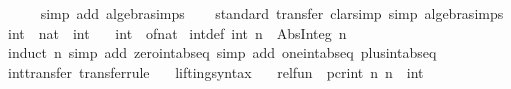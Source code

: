 \begin{isabellebody}
\ \ \ \ \isamarkupfalse%
\ {\isacharparenleft}{\kern0pt}simp\ add{\isacharcolon}{\kern0pt}\ algebra{\isacharunderscore}{\kern0pt}simps{\isacharparenright}{\kern0pt}\isanewline
{}\isamarkupfalse%
%
\endisatagproof
{\isafoldproof}%
%
\isadelimproof
\isanewline
%
\endisadelimproof
\isanewline
{}\isamarkupfalse%
\isanewline
%
\isadelimproof
\ \ %
\endisadelimproof
%
\isatagproof
{}\isamarkupfalse%
\ standard\ {\isacharparenleft}{\kern0pt}transfer{\isacharsemicolon}{\kern0pt}\ clarsimp\ simp{\isacharcolon}{\kern0pt}\ algebra{\isacharunderscore}{\kern0pt}simps{\isacharparenright}{\kern0pt}{\isacharplus}{\kern0pt}%
\endisatagproof
{\isafoldproof}%
%
\isadelimproof
\isanewline
%
\endisadelimproof
\isanewline
{}\isamarkupfalse%
\isanewline
\isanewline
{}\isamarkupfalse%
\ int\ {\isacharcolon}{\kern0pt}{\isacharcolon}{\kern0pt}\ {\isachardoublequoteopen}nat\ {\isasymRightarrow}\ int{\isachardoublequoteclose}\isanewline
\ \ \ {\isachardoublequoteopen}int\ {\isasymequiv}\ of{\isacharunderscore}{\kern0pt}nat{\isachardoublequoteclose}\isanewline
\isanewline
{}\isamarkupfalse%
\ int{\isacharunderscore}{\kern0pt}def{\isacharcolon}{\kern0pt}\ {\isachardoublequoteopen}int\ n\ {\isacharequal}{\kern0pt}\ Abs{\isacharunderscore}{\kern0pt}Integ\ {\isacharparenleft}{\kern0pt}n{\isacharcomma}{\kern0pt}\ {}{\isacharparenright}{\kern0pt}{\isachardoublequoteclose}\isanewline
%
\isadelimproof
\ \ %
\endisadelimproof
%
\isatagproof
{}\isamarkupfalse%
\ {\isacharparenleft}{\kern0pt}induct\ n{\isacharparenright}{\kern0pt}\ {\isacharparenleft}{\kern0pt}simp\ add{\isacharcolon}{\kern0pt}\ zero{\isacharunderscore}{\kern0pt}int{\isachardot}{\kern0pt}abs{\isacharunderscore}{\kern0pt}eq{\isacharcomma}{\kern0pt}\ simp\ add{\isacharcolon}{\kern0pt}\ one{\isacharunderscore}{\kern0pt}int{\isachardot}{\kern0pt}abs{\isacharunderscore}{\kern0pt}eq\ plus{\isacharunderscore}{\kern0pt}int{\isachardot}{\kern0pt}abs{\isacharunderscore}{\kern0pt}eq{\isacharparenright}{\kern0pt}%
\endisatagproof
{\isafoldproof}%
%
\isadelimproof
\isanewline
%
\endisadelimproof
\isanewline
{}\isamarkupfalse%
\ int{\isacharunderscore}{\kern0pt}transfer\ {\isacharbrackleft}{\kern0pt}transfer{\isacharunderscore}{\kern0pt}rule{\isacharbrackright}{\kern0pt}{\isacharcolon}{\kern0pt}\isanewline
\ \ \ lifting{\isacharunderscore}{\kern0pt}syntax\isanewline
\ \ \ {\isachardoublequoteopen}rel{\isacharunderscore}{\kern0pt}fun\ {\isacharparenleft}{\kern0pt}{\isacharequal}{\kern0pt}{\isacharparenright}{\kern0pt}\ pcr{\isacharunderscore}{\kern0pt}int\ {\isacharparenleft}{\kern0pt}{\isasymlambda}n{\isachardot}{\kern0pt}\ {\isacharparenleft}{\kern0pt}n{\isacharcomma}{\kern0pt}\ {}{\isacharparenright}{\kern0pt}{\isacharparenright}{\kern0pt}\ int{\isachardoublequoteclose}\isanewline

\end{isabellebody}

